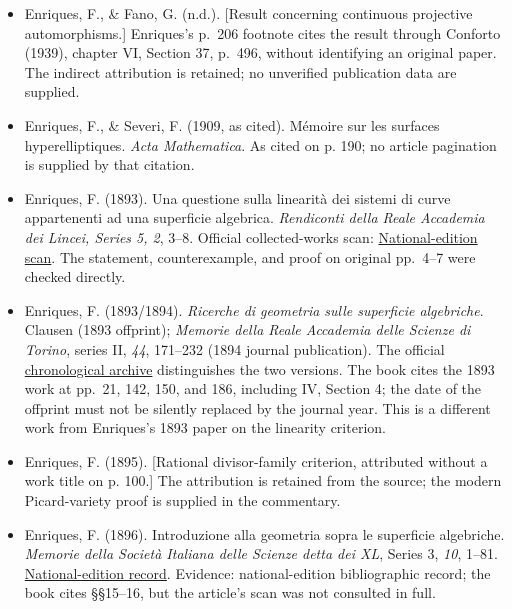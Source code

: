 \begin{sloppypar}
\begin{itemize}
\item Enriques, F., \& Fano, G. (n.d.). [Result concerning continuous projective automorphisms.] Enriques's p.~206 footnote cites the result through Conforto (1939), chapter VI, Section 37, p.~496, without identifying an original paper. The indirect attribution is retained; no unverified publication data are supplied.

\item Enriques, F., \& Severi, F. (1909, as cited). M\'emoire sur les surfaces hyperelliptiques. \emph{Acta Mathematica}. As cited on p. 190; no article pagination is supplied by that citation.

\item Enriques, F. (1893). Una questione sulla linearità dei sistemi di curve appartenenti ad una superficie algebrica. \emph{Rendiconti della Reale Accademia dei Lincei, Series 5, 2}, 3--8. Official collected-works scan: \href{https://www.federigoenriques.org/wp-content/uploads/opere/pdf/GM_Enriques_1893_3.pdf}{National-edition scan}. The statement, counterexample, and proof on original pp.~4--7 were checked directly.

\item Enriques, F. (1893/1894). \emph{Ricerche di geometria sulle superficie algebriche}. Clausen (1893 offprint); \emph{Memorie della Reale Accademia delle Scienze di Torino}, series II, \emph{44}, 171--232 (1894 journal publication). The official \href{https://www.federigoenriques.org/indice-cronologico-delle-opere/}{chronological archive} distinguishes the two versions. The book cites the 1893 work at pp.~21, 142, 150, and 186, including IV, Section 4; the date of the offprint must not be silently replaced by the journal year. This is a different work from Enriques's 1893 paper on the linearity criterion.

\item Enriques, F. (1895). [Rational divisor-family criterion, attributed without a work title on p. 100.] The attribution is retained from the source; the modern Picard-variety proof is supplied in the commentary.

\item Enriques, F. (1896). Introduzione alla geometria sopra le superficie algebriche. \emph{Memorie della Società Italiana delle Scienze detta dei XL}, Series 3, \emph{10}, 1--81. \href{https://www.federigoenriques.org/indice-cronologico-delle-opere/}{National-edition record}. Evidence: national-edition bibliographic record; the book cites §§15--16, but the article's scan was not consulted in full.


\end{itemize}
\end{sloppypar}
